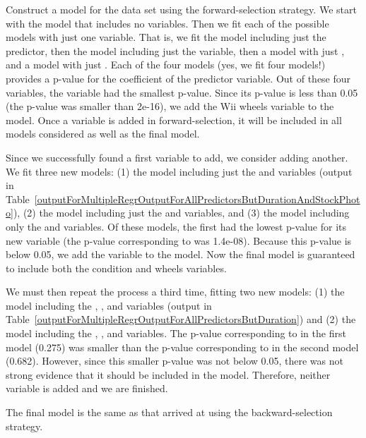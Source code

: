\begin{example}{Construct a model for the  data set using the forward-selection strategy.}\label{forwardEliminationExampleWMarioKartData}
We start with the model that includes no variables. Then we fit each of the possible models with just one variable. That is, we fit the model including just the  predictor, then the model including just the  variable, then a model with just , and a model with just . Each of the four models (yes, we fit four models!) provides a p-value for the coefficient of the predictor variable. Out of these four variables, the  variable had the smallest p-value. Since its p-value is less than 0.05 (the p-value was smaller than 2e-16), we add the Wii wheels variable to the model. Once a variable is added in forward-selection, it will be included in all models considered as well as the final model.

Since we successfully found a first variable to add, we consider adding another. We fit three new models: (1) the model including just the  and  variables (output in Table~\ref{outputForMultipleRegrOutputForAllPredictorsButDurationAndStockPhoto}), (2) the model including just the  and  variables, and (3) the model including only the  and  variables. Of these models, the first had the lowest p-value for its new variable (the p-value corresponding to  was 1.4e-08). Because this p-value is below 0.05, we add the  variable to the model. Now the final model is guaranteed to include both the condition and wheels variables.

We must then repeat the process a third time, fitting two new models: (1) the model including the , , and  variables (output in Table~\ref{outputForMultipleRegrOutputForAllPredictorsButDuration}) and (2) the model including the , , and  variables. The p-value corresponding to  in the first model (0.275) was smaller than the p-value corresponding to  in the second model (0.682). However, since this smaller p-value was not below 0.05, there was not strong evidence that it should be included in the model. Therefore, neither variable is added and we are finished.

The final model is the same as that arrived at using the backward-selection strategy.
\end{example}

